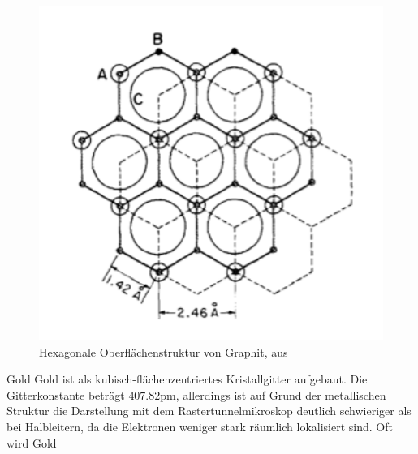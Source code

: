 \begin{figure}
    \includegraphics[width=1.0\textwidth]{pics/graphite}
    \caption{Hexagonale Oberflächenstruktur von Graphit, aus \cite{park1986tunneling}}
    \label{fig:graphite}
\end{figure} 

Gold
Gold ist als kubisch-flächenzentriertes Kristallgitter aufgebaut. Die Gitterkonstante 
beträgt $407.82\mathrm{pm}$\cite{ohring1995engineering}, allerdings ist auf Grund der 
metallischen Struktur die Darstellung mit dem Rastertunnelmikroskop deutlich 
schwieriger als bei Halbleitern, da die Elektronen weniger stark räumlich lokalisiert 
sind. Oft wird Gold 

